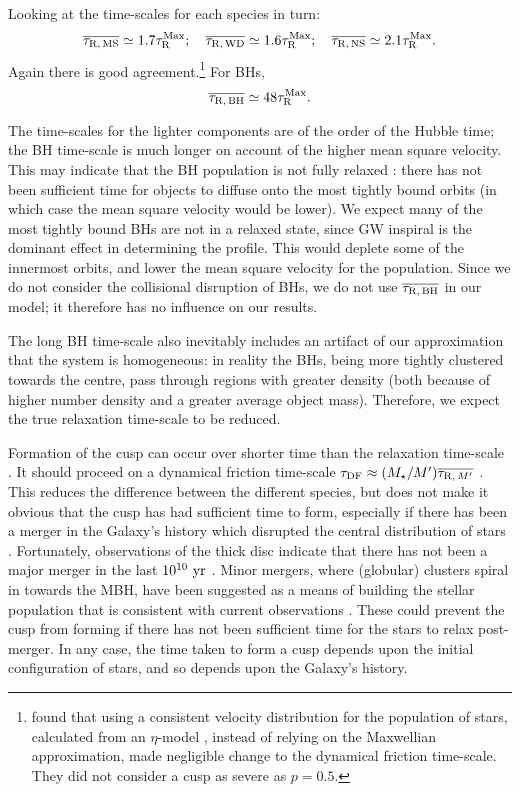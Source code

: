 Looking at the time-scales for each species in turn:
\begin{equation}
\overline{\tau_\mathrm{R,\,MS}} \simeq 1.7 \tau_\mathrm{R}^\mathrm{Max};\quad \overline{\tau_\mathrm{R,\,WD}} \simeq 1.6 \tau_\mathrm{R}^\mathrm{Max};\quad \overline{\tau_\mathrm{R,\,NS}} \simeq 2.1 \tau_\mathrm{R}^\mathrm{Max}.
\end{equation}
Again there is good agreement.\footnote{\citet*{Freitag2006} found that using a consistent velocity distribution for the population of stars, calculated from an $\eta$-model \citep{Tremaine1994}, instead of relying on the Maxwellian approximation, made negligible change to the dynamical friction time-scale. They did not consider a cusp as severe as $p = 0.5$.} For BHs,
\begin{equation}
\overline{\tau_\mathrm{R,\,BH}} \simeq 48 \tau_\mathrm{R}^\mathrm{Max}.
\end{equation}

The time-scales for the lighter components are of the order of the Hubble time; the BH time-scale is much longer on account of the higher mean square velocity. This may indicate that the BH population is not fully relaxed \citep[cf.][]{Antonini2011}: there has not been sufficient time for objects to diffuse onto the most tightly bound orbits (in which case the mean square velocity would be lower). We expect many of the most tightly bound BHs are not in a relaxed state, since GW inspiral is the dominant effect in determining the profile. This would deplete some of the innermost orbits, and lower the mean square velocity for the population. Since we do not consider the collisional disruption of BHs, we do not use $\overline{\tau_\mathrm{R,\,BH}}$ in our model; it therefore has no influence on our results.

The long BH time-scale also inevitably includes an artifact of our approximation that the system is homogeneous: in reality the BHs, being more tightly clustered towards the centre, pass through regions with greater density (both because of higher number density and a greater average object mass). Therefore, we expect the true relaxation time-scale to be reduced. 

Formation of the cusp can occur over shorter time than the relaxation time-scale \citep{Bar-Or2012}. It should proceed on a dynamical friction time-scale $\tau_\mathrm{DF} \approx (M_\star/M')\overline{\tau_{\mathrm{R},\,M'}}$ \citep[section 3.4]{Spitzer1987Jr}. This reduces the difference between the different species, but does not make it obvious that the cusp has had sufficient time to form, especially if there has been a merger in the Galaxy's history which disrupted the central distribution of stars \citep{Gualandris2012}. Fortunately, observations of the thick disc indicate that there has not been a major merger in the last $10^{10}~\mathrm{yr}$ \citep{Wyse2008}. Minor mergers, where (globular) clusters spiral in towards the MBH, have been suggested as a means of building the stellar population that is consistent with current observations \citep{Antonini2011a,Antonini2013}. These could prevent the cusp from forming if there has not been sufficient time for the stars to relax post-merger. In any case, the time taken to form a cusp depends upon the initial configuration of stars, and so depends upon the Galaxy's history.

